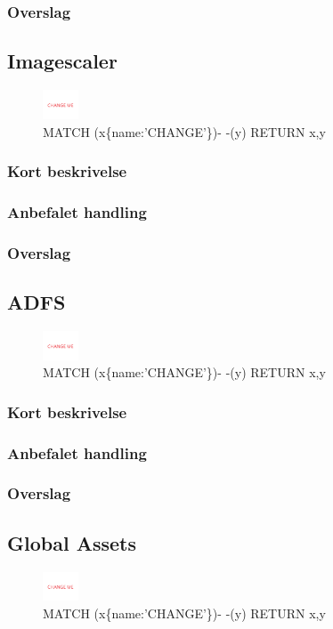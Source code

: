 \documentclass{article}
\begin{document}
\subsubsection{Overslag}


\subsection{Imagescaler}
\begin{figure}[h]
\includegraphics[width=30pt]{CHANGE.PNG}
\caption{MATCH (x\{name:'CHANGE'\})- -(y) RETURN x,y}
\end{figure}
\subsubsection{Kort beskrivelse}
\subsubsection{Anbefalet handling}
\subsubsection{Overslag}


\subsection{ADFS}
\begin{figure}[h]
\includegraphics[width=30pt]{CHANGE.PNG}
\caption{MATCH (x\{name:'CHANGE'\})- -(y) RETURN x,y}
\end{figure}
\subsubsection{Kort beskrivelse}
\subsubsection{Anbefalet handling}
\subsubsection{Overslag}


\subsection{Global Assets}
\begin{figure}[h]
\includegraphics[width=30pt]{CHANGE.PNG}
\caption{MATCH (x\{name:'CHANGE'\})- -(y) RETURN x,y}
\end{figure}
\end{document}
